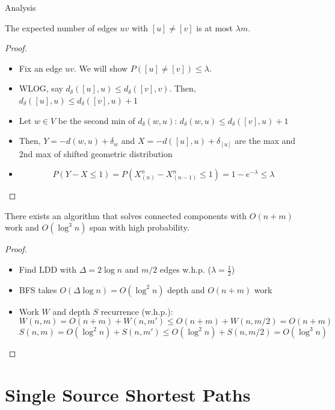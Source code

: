 \documentclass[aspectratio=169]{beamer}
\begin{document}
\begin{frame}[allowframebreaks]{Analysis}
    \begin{lemma}
        The expected number of edges $uv$ with $[u] \ne [v]$ is at most $\lambda m$.
    \end{lemma}

    \begin{proof}
        \begin{itemize}
            \item Fix an edge $uv$. We will show $P([u] \ne [v]) \le \lambda$.
            \item WLOG, say $d_\delta([u], u) \le d_\delta([v], v)$. Then, $d_\delta([u], u) \le d_\delta([v], u) + 1$
            \item Let $w \in V$ be the second min of $d_\delta(w, u)$: $d_\delta(w, u) \le d_\delta([v], u) + 1$
            \item Then, $Y = - d(w, u) + \delta_w$ and $X = - d([u], u) + \delta_{[u]}$ are the max and 2nd max of shifted geometric distribution
            \item $$
                      P(Y - X \le 1) = P(X^n_{(n)} - X^n_{(n-1)} \le 1) = 1 - e^{-\lambda} \le \lambda
                  $$
        \end{itemize}
    \end{proof}

    \begin{theorem}
        There exists an algorithm that solves connected components with $O(n+m)$ work and $O(\log^3 n)$ span with high probability.
    \end{theorem}

    \begin{proof}
        \begin{itemize}
            \item Find LDD with $\Delta = 2 \log n$ and $m/2$ edges w.h.p. ($\lambda = \frac{1}{2}$)
            \item BFS takes $O(\Delta \log n) = O(\log^2 n)$ depth and $O(n+m)$ work
            \item Work $W$ and depth $S$ recurrence (w.h.p.):
                  $$
                      W(n, m) = O(n+m) + W(n, m') \le O(n+m) + W(n, m/2) = O(n+m)
                  $$
                  $$
                      S(n, m) = O(\log^2 n) + S(n, m') \le O(\log^2 n) + S(n, m/2) = O(\log^3 n)
                  $$
        \end{itemize}
    \end{proof}
\end{frame}

\section{Single Source Shortest Paths}
\frame{\tableofcontents[currentsection]}
\end{document}
